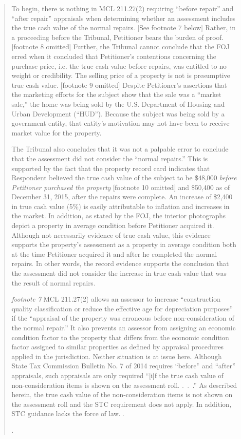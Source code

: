 \documentclass[12pt,\documentclassflag]{michiganCourtOfAppealsBrief}
\begin{document}
\begin{quotation}
To begin, there is nothing in MCL 211.27(2) requiring ``before repair'' and ``after repair'' appraisals when determining whether an assessment includes the true cash value of the normal repairs. [See footnote 7 below] Rather, in a proceeding before the Tribunal, Petitioner bears the burden of proof. [footnote 8 omitted] Further, the Tribunal cannot conclude that the FOJ erred when it concluded that Petitioner's contentions concerning the purchase price, i.e. the true cash value before repairs, was entitled to no weight or credibility. The selling price of a property is not is presumptive true cash value. [footnote 9 omitted] Despite Petitioner's assertions that the marketing efforts for the subject show that the sale was a ``market sale,'' the home was being sold by the U.S. Department of Housing and Urban Development (``HUD''). Because the subject was being sold by a government entity, that entity's motivation may not have been to receive market value for the property.

The Tribunal also concludes that it was not a palpable error to conclude that the assessment did not consider the ``normal repairs.'' This is supported by the fact that the property record card indicates that Respondent believed the true cash value of the subject to be \$48,000 \textit{before Petitioner purchased the property} [footnote 10 omitted] and \$50,400 as of December 31, 2015, after the repairs were complete. An increase of \$2,400 in true cash value (5\%) is easily attributable to inflation and increases in the market. In addition, as stated by the FOJ, the interior photographs depict a property in average condition before Petitioner acquired it. Although not necessarily evidence of true cash value, this evidence supports the property's assessment as a property in average condition both at the time Petitioner acquired it and after he completed the normal repairs. In other words, the record evidence supports the conclusion that the assessment did not consider the increase in true cash value that was the result of normal repairs.

\textit{footnote 7} MCL 211.27(2) allows an assessor to increase ``construction quality classification or reduce the effective age for depreciation purposes'' if the ``appraisal of the property was erroneous before non-consideration of the normal repair.'' It also prevents an assessor from assigning an economic condition factor to the property that differs from the economic condition factor assigned to similar properties as defined by appraisal procedures applied in the jurisdiction. Neither situation is at issue here. Although State Tax Commission Bulletin No. 7 of 2014 requires ``before'' and ``after'' appraisals, such appraisals are only required ``[i]f the true cash value of non-consideration items is shown on the assessment roll. .~.~.'' As described herein, the true cash value of the non-consideration items is not shown on the assessment roll and the STC requirement does not apply. In addition, STC guidance lacks the force of law. .

\reconsiderationDenied[2].
\end{quotation}
\end{document}
